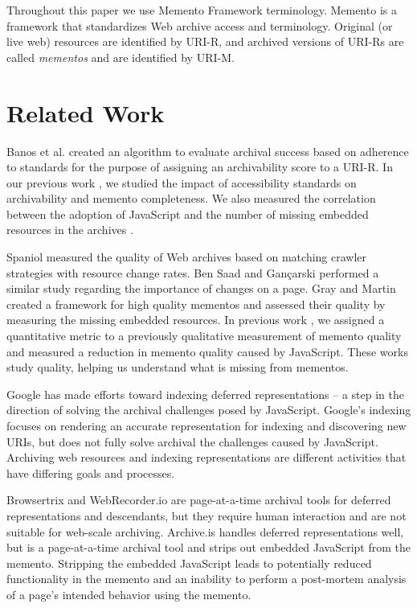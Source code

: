 \documentclass{sig-alternate}
\begin{document}
Throughout this paper we use Memento Framework terminology. Memento \cite{nelson:memento:tr, mementorfc} is a framework that standardizes Web archive access and terminology. Original (or live web) resources are identified by URI-R, and archived versions of URI-Rs are called \emph{mementos} and are identified by URI-M. 

\section{Related Work}
\label{priorwork}
Banos et al. \cite{ipresArchivability} created an algorithm to evaluate archival success based on adherence to standards for the purpose of assigning an archivability score to a URI-R. In our previous work \cite{kellyTPDL2013}, we studied the impact of accessibility standards on archivability and memento completeness. We also measured the correlation between the adoption of JavaScript and the number of missing embedded resources in the archives \cite{ijdl}. 

Spaniol \cite{spaniol9catch, spaniol2009data, Denev:2009:SFQ:1687627.1687694} measured the quality of Web archives based on matching crawler strategies with resource change rates. Ben Saad and Gan\c{c}arski \cite{saad2011} performed a similar study regarding the importance of changes on a page. Gray and Martin \cite{mementoQuality} created a framework for high quality mementos and assessed their quality by measuring the missing embedded resources. In previous work \cite{brunelleDamage}, we assigned a quantitative metric to a previously qualitative measurement of memento quality and measured a reduction in memento quality caused by JavaScript. These works study quality, helping us understand what is missing from mementos.

Google has made efforts toward indexing deferred representations \cite{googleJS} -- a step in the direction of solving the archival challenges posed by JavaScript. Google's indexing focuses on rendering an accurate representation for indexing and discovering new URIs, but does not fully solve archival the challenges caused by JavaScript. Archiving web resources and indexing representations are different activities that have differing goals and processes.

Browsertrix \cite{browsertrix} and WebRecorder.io \cite{webrecorder} are page-at-a-time archival tools for deferred representations and descendants, but they require human interaction and are not suitable for web-scale archiving. Archive.is \cite{archivetoday} handles deferred representations well, but is a page-at-a-time archival tool and strips out embedded JavaScript from the memento. Stripping the embedded JavaScript leads to potentially reduced functionality in the memento and an inability to perform a post-mortem analysis of a page's intended behavior using the memento.
\end{document}
